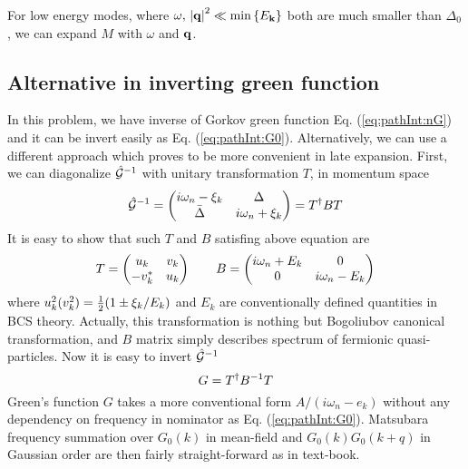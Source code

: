 For low energy modes, where $\omega,\,\left\lvert{\ensuremath{\mathbf{q}}}\right\rvert^{2}\ll\min\left\{E_{\mathbf{k}}\right\}$ both are much smaller than $\Delta_{0}$, we can expand $M$ with $\omega$ and $\mathbf{q}$.  


\subsection{Alternative in inverting green function\label{sec:diagonalizeGreen1}}
In this problem, we have inverse of Gorkov green function Eq. (\ref{eq:pathInt:nG}) and it can be invert easily as Eq. (\ref{eq:pathInt:G0}).   Alternatively, we can use a different approach which proves to be more convenient in late expansion.  First, we can diagonalize $\hat{\mathcal{G}}^{-1}$ with unitary transformation $T$, in momentum space
\begin{equation}
\hat{\mathcal{G}}^{-1}=\begin{pmatrix}i\omega_{n}-\xi_{k}&\Delta\\\bar\Delta&i\omega_{n}+\xi_{k}\end{pmatrix}=T^{\dagger}BT
\end{equation}
It is easy to show that such $T$ and $B$ satisfing above equation are
\begin{equation}
T=\begin{pmatrix}u_{k}&v_{k}\\-v_{k}^{*}&u_{k}\end{pmatrix}\qquad{}B=\begin{pmatrix}i\omega_{n}+E_{k}&0\\0&i\omega_{n}-E_{k}\end{pmatrix}
\end{equation}
where $u_{k}^{2}(v_{k}^{2})=\frac{1}{2}(1\pm\xi_{k}/E_{k})$ and $E_{k}$ are conventionally defined quantities in BCS theory.   Actually, this transformation is nothing but Bogoliubov canonical transformation, and $B$ matrix simply describes spectrum of fermionic quasi-particles.  Now it is easy to invert $\hat{\mathcal{G}}^{-1}$
\begin{equation}
G=T^{\dagger}B^{-1}T
\end{equation}
Green's function $G$ takes a more conventional form $A/(i\omega_{n}-e_{k})$ without any dependency on frequency in nominator as Eq. (\ref{eq:pathInt:G0}). Matsubara frequency summation over $G_{0}(k)$ in mean-field and $G_{0}(k)G_{0}(k+q)$ in Gaussian order are then fairly straight-forward as in text-book.  
